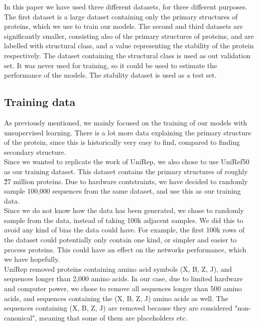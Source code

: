 In this paper we have used three different datasets, for three different purposes. The first dataset is a large dataset containing only the primary structures of proteins, which we use to train our models. The second and third datasets are significantly smaller, consisting also of the primary structures of proteins, and are labelled with structural class, and a value representing the stability of the protein respectively. The dataset containing the structural class is used as out validation set. It was never used for training, so it could be used to estimate the performance of the models. The stability dataset is used as a test set.

\subsection{Training data}
As previously mentioned, we mainly focused on the training of our models with unsupervised learning. There is a lot more data explaining the primary structure of the protein, since this is historically very easy to find, compared to finding secondary structure. \\

\noindent
Since we wanted to replicate the work of UniRep, we also chose to use UniRef50 as our training dataset.\cite{uniref} This dataset contains the primary structures of roughly \~ 27 million proteins. Due to hardware contstraints, we have decided to randomly sample 100,000 sequences from the same dataset, and use this as our training data. \\
Since we do not know how the data has been generated, we chose to randomly sample from the data, instead of taking 100k adjacent samples. We did this to avoid any kind of bias the data could have. For example, the first 100k rows of the dataset could potentially only contain one kind, or simpler and easier to process proteins. This could have an effect on the networks performance, which we have hopefully.\\

\noindent
UniRep removed proteins containing amino acid symbols (X, B, Z, J), and sequences longer than 2,000 amino acids.\cite{unirep} In our case, due to limited hardware and computer power, we chose to remove all sequences longer than 500 amino acids, and sequences containing the (X, B, Z, J) amino acids as well. The sequences containing (X, B, Z, J) are removed because they are considered "non-canonical", meaning that some of them are placeholders etc.\\

